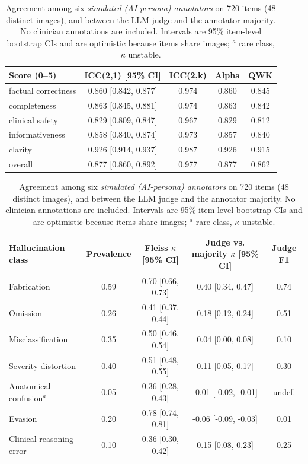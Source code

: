 \begin{table}[t]
\centering
\small
\begin{tabular}{lcccc}
\toprule
Score (0--5) & ICC(2,1) [95\% CI] & ICC(2,k) & Alpha & QWK \\
\midrule
factual correctness & 0.860 [0.842, 0.877] & 0.974 & 0.860 & 0.845 \\
completeness & 0.863 [0.845, 0.881] & 0.974 & 0.863 & 0.842 \\
clinical safety & 0.829 [0.809, 0.847] & 0.967 & 0.829 & 0.812 \\
informativeness & 0.858 [0.840, 0.874] & 0.973 & 0.857 & 0.840 \\
clarity & 0.926 [0.914, 0.937] & 0.987 & 0.926 & 0.915 \\
overall & 0.877 [0.860, 0.892] & 0.977 & 0.877 & 0.862 \\
\bottomrule
\end{tabular}
\par\medskip
\small
\begin{tabular}{lcccc}
\toprule
Hallucination class & Prevalence & Fleiss $\kappa$ [95\% CI] & Judge vs. majority $\kappa$ [95\% CI] & Judge F1 \\
\midrule
Fabrication & 0.59 & 0.70 [0.66, 0.73] & 0.40 [0.34, 0.47] & 0.74 \\
Omission & 0.26 & 0.41 [0.37, 0.44] & 0.18 [0.12, 0.24] & 0.51 \\
Misclassification & 0.35 & 0.50 [0.46, 0.54] & 0.04 [0.00, 0.08] & 0.10 \\
Severity distortion & 0.40 & 0.51 [0.48, 0.55] & 0.11 [0.05, 0.17] & 0.30 \\
Anatomical confusion$^{a}$ & 0.05 & 0.36 [0.28, 0.43] & -0.01 [-0.02, -0.01] & undef. \\
Evasion & 0.20 & 0.78 [0.74, 0.81] & -0.06 [-0.09, -0.03] & 0.01 \\
Clinical reasoning error & 0.10 & 0.36 [0.30, 0.42] & 0.15 [0.08, 0.23] & 0.25 \\
\bottomrule
\end{tabular}
\caption{Agreement among six \emph{simulated (AI-persona) annotators} on 720 items (48 distinct images), and between the LLM judge and the annotator majority. No clinician annotations are included. Intervals are 95\% item-level bootstrap CIs and are optimistic because items share images; $^{a}$ rare class, $\kappa$ unstable.}
\label{tab:annotation}
\end{table}
